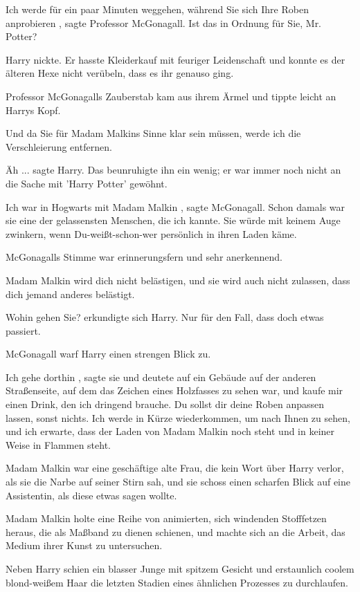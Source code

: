 \glqq Ich werde für ein paar Minuten weggehen, während Sie
sich Ihre Roben anprobieren\grqq{} , sagte Professor McGonagall.
\glqq Ist das in Ordnung für Sie, Mr. Potter?\grqq{}

Harry nickte. Er hasste Kleiderkauf mit feuriger Leidenschaft und konnte es der älteren Hexe nicht verübeln,
dass es ihr genauso ging.

Professor McGonagalls Zauberstab kam aus ihrem Ärmel und tippte leicht an Harrys
Kopf.

\glqq Und da Sie für Madam Malkins Sinne klar sein müssen, werde ich die Verschleierung
entfernen.\grqq{}

\glqq Äh ...\grqq{} sagte Harry.
Das beunruhigte ihn ein wenig; er war immer noch
nicht an die Sache mit 'Harry Potter' gewöhnt.

\glqq Ich war in Hogwarts mit Madam Malkin\grqq{} , sagte
McGonagall.
\glqq Schon damals war sie eine der gelassensten Menschen, die ich kannte. Sie würde mit keinem Auge
zwinkern, wenn Du-weißt-schon-wer persönlich in ihren Laden käme.\grqq{}

McGonagalls Stimme war
erinnerungsfern und sehr anerkennend.

\glqq Madam Malkin wird dich nicht belästigen, und sie wird auch nicht
zulassen, dass dich jemand anderes belästigt.\grqq{}

\glqq Wohin gehen Sie?\grqq{} erkundigte sich Harry.
\glqq Nur für den Fall, dass doch etwas passiert.\grqq{}

McGonagall warf Harry einen strengen Blick zu.

\glqq Ich gehe dorthin\grqq{} ,
sagte sie und deutete auf ein Gebäude auf der anderen Straßenseite, auf
dem das Zeichen eines Holzfasses zu sehen war,
\glqq und kaufe mir einen Drink, den ich dringend brauche. Du
sollst dir deine Roben anpassen lassen, sonst nichts. Ich werde in Kürze wiederkommen, um nach Ihnen zu sehen, und ich
erwarte, dass der Laden von Madam Malkin noch steht und in keiner Weise in Flammen steht.\grqq{}

Madam Malkin
war eine geschäftige alte Frau, die kein Wort über Harry verlor, als sie die Narbe auf seiner Stirn sah, und sie schoss
einen scharfen Blick auf eine Assistentin, als diese etwas sagen wollte.

Madam Malkin holte eine Reihe von
animierten, sich windenden Stofffetzen heraus, die als Maßband zu dienen schienen, und machte sich an die Arbeit, das
Medium ihrer Kunst zu untersuchen.

Neben Harry schien ein blasser Junge mit spitzem Gesicht und erstaunlich
coolem blond-weißem Haar die letzten Stadien eines ähnlichen Prozesses zu durchlaufen.


